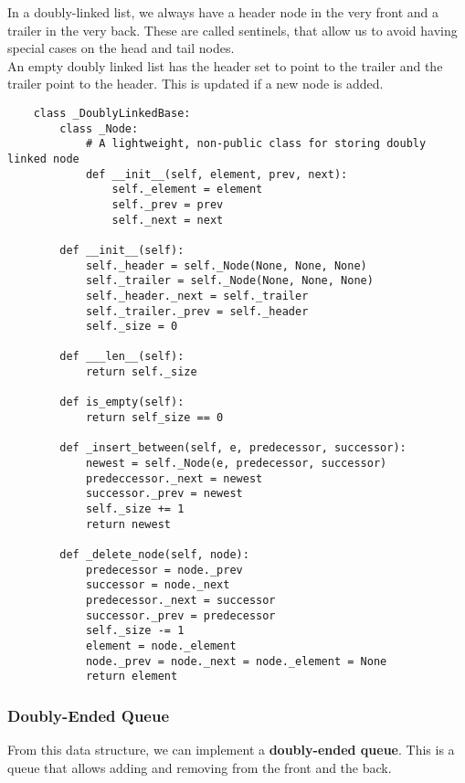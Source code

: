 \documentclass[]{article}
\begin{document}
In a doubly-linked list, we always have a header node in the very front and a trailer in the very back. These are called sentinels, that allow us to avoid having special cases on the head and tail nodes. \\

An empty doubly linked list has the header set to point to the trailer and the trailer point to the header. This is updated if a new node is added. \\


\begin{lstlisting}
	class _DoublyLinkedBase:
		class _Node:
			# A lightweight, non-public class for storing doubly linked node
			def __init__(self, element, prev, next):
				self._element = element
				self._prev = prev
				self._next = next
			
		def __init__(self):
			self._header = self._Node(None, None, None)
			self._trailer = self._Node(None, None, None)
			self._header._next = self._trailer
			self._trailer._prev = self._header
			self._size = 0
			
		def ___len__(self):
			return self._size
			
		def is_empty(self):
			return self_size == 0
			
		def _insert_between(self, e, predecessor, successor):
			newest = self._Node(e, predecessor, successor)
			predeccessor._next = newest
			successor._prev = newest
			self._size += 1
			return newest
		
		def _delete_node(self, node):
			predecessor = node._prev
			successor = node._next
			predecessor._next = successor
			successor._prev = predecessor
			self._size -= 1
			element = node._element
			node._prev = node._next = node._element = None
			return element
\end{lstlisting}\bigbreak

\subsubsection{Doubly-Ended Queue}\bigbreak

From this data structure, we can implement a \textbf{doubly-ended queue}. This is a queue that allows adding and removing from the front and the back.\\
\end{document}
